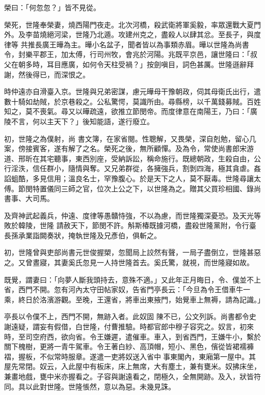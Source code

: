 \begin{pinyinscope}
 榮曰：「何忽忽？」皆不見從。



 榮死，世隆奉榮妻，燒西陽門夜走。北次河橋，殺武衛將軍奚毅，率眾還戰大夏門外。及李苗燒絕河梁，世隆乃北遁。攻建州克之，盡殺人以肆其忿。至長子，與度律等
 共推長廣王曄為主。曄小名盆子，聞者皆以為事類赤眉。曄以世隆為尚書令，封樂平郡王，加太傅，行司州牧，會兆於河陽。兆既平京邑，讓世隆曰：「叔父在朝多時，耳目應廣，如何令天柱受禍？」按劍嗔目，詞色甚厲。世隆遜辭拜謝，然後得已，而深恨之。



 時仲遠亦自滑臺入京。世隆與兄弟密謀，慮元曄母干豫朝政，伺其母衛氏出行，遣數十騎如劫賊，於京巷殺之。公私驚愕，莫識所由。尋縣榜，以千萬錢募賊。百姓知之，莫不喪氣。尋又以曄疏遠，欲推立節閔帝。而度律意在南陽王，乃曰：「廣陵不言，何以主天下？」後知能語，遂行廢立。



 初，世隆之為僕射，尚
 書文簿，在家省閱。性聰解，又畏榮，深自剋勉，留心几案，傍接賓客，遂有解了之名。榮死之後，無所顧憚。及為令，常使尚書郎宋游道、邢昕在其宅聽事，東西別座，受納訴訟，稱命施行。既總朝政，生殺自由，公行淫泆，信任群小，隨情與奪。又兄弟群從，各擁強兵，割剝四海，極其貪虐。姦諂蛆酷，多見信用；溫良名士，罕豫腹心。於是天下之人，莫不厭毒。世隆尋讓太傅。節閔特置儀同三師之官，位次上公之下，以世隆為之。贈其父買珍相國、錄尚書事、大司馬。



 及齊神武起義兵，仲遠、度律等愚贛恃強，不以為慮，而世隆獨深憂恐。及天光等敗於韓陵，世隆
 請赦天下，節閔不許。斛斯椿既據河橋，盡殺世隆黨附，令行臺長孫承業詣闕奏狀，掩執世隆及兄彥伯，俱斬之。



 初，世隆曾與吏部尚書元世俊握槊，忽聞局上詨然有聲，一局子盡倒立，世隆甚惡之。又曾晝寢，其妻奚氏忽見一人持世隆首去。奚氏驚，就視，而世隆寢如故。



 既覺，謂妻曰：「向夢人斷我頭持去，意殊不適。」又此年正月晦日，令、僕並不上省，西門不開。忽有河內太守田帖家奴，告省門亭長云：「今旦為令王借車牛一乘，終日於洛濱游觀。至晚，王還省，將車出東掖門，始覺車上無褥，請為記識。」



 亭長以令僕不上，西門不開，無跡入者。此奴固
 陳不已，公文列訴。尚書都令史謝遠疑，謂妄有假借，白世隆，付曹推驗。時都官郎中穆子容究之。奴言，初來時，至司空府西，欲向省。令王嫌遲，遣催車。車入，到省西門，王嫌牛小，繫於關下槐樹，更將一青牛駕車。令王著白紗、高頂帽，短小、黑色，儐從皆裙襦褲褶，握板，不似常時服章。遂遣一吏將奴送入省中事東閣內，東廂第一屋中。其屋先常閉。奴云，入此屋中有板床，床上無席，大有塵土，兼有甕米。奴拂床坐，兼畫地戲，甕中米亦握看之。子容與謝遠看之，閉極久，全無開跡。及入，狀皆符同。具以此對世隆。世隆悵然，意以為惡。未幾見誅。




\end{pinyinscope}
